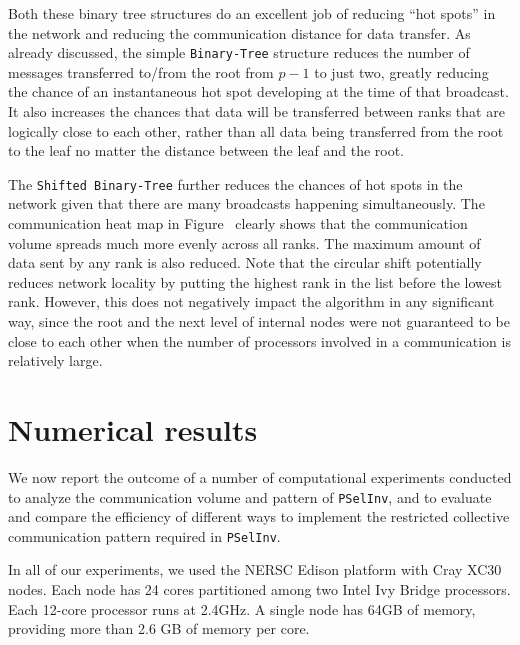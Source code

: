 \documentclass{acm_proc_article-sp}
\newcommand{\pselinv}{\texttt{PSelInv}\xspace}
\newcommand{\btree}{\texttt{Binary-Tree}\xspace}
\newcommand{\modbtree}{\texttt{Shifted Binary-Tree}\xspace}
\begin{document}
Both these binary tree structures do an excellent job of reducing ``hot spots'' in 
the network and reducing the communication distance for data transfer.
As already discussed, the simple \btree structure reduces the number of
messages transferred to/from the root from $p-1$ to just two, greatly 
reducing the chance of an instantaneous hot spot developing at the 
time of that broadcast.  It also increases the chances that data will 
be transferred between ranks that are logically close to each other, 
rather than all data being transferred from the root to the leaf no 
matter the distance between the leaf and the root.  

The \modbtree further reduces the chances of hot spots in
the network given that there are many broadcasts happening
simultaneously.  The communication heat map in
Figure~ clearly shows that the
communication volume spreads much more evenly across all ranks. 
The maximum amount of data sent by any rank is also reduced. Note that the circular
shift potentially reduces network locality by putting the highest
rank in the list before the lowest rank. However, this
does not negatively impact the algorithm in any
significant way, since the root and the next level of internal nodes
were not guaranteed to be close to each other when the number of
processors involved in a communication is relatively large.





\section{Numerical results}\label{sec:numerical}
We now report the outcome of a number of computational experiments 
conducted to analyze the communication volume and pattern of
\pselinv, and to evaluate and compare the efficiency of different
ways to implement the restricted collective communication pattern
required in \pselinv.

In all of our experiments, we used the NERSC Edison platform with Cray
XC30 nodes. Each node has 24 cores partitioned among two
Intel Ivy Bridge processors.  Each 12-core processor runs at 2.4GHz. A
single node has 64GB of memory, providing more than 2.6 GB of memory per
core.  
\end{document}
